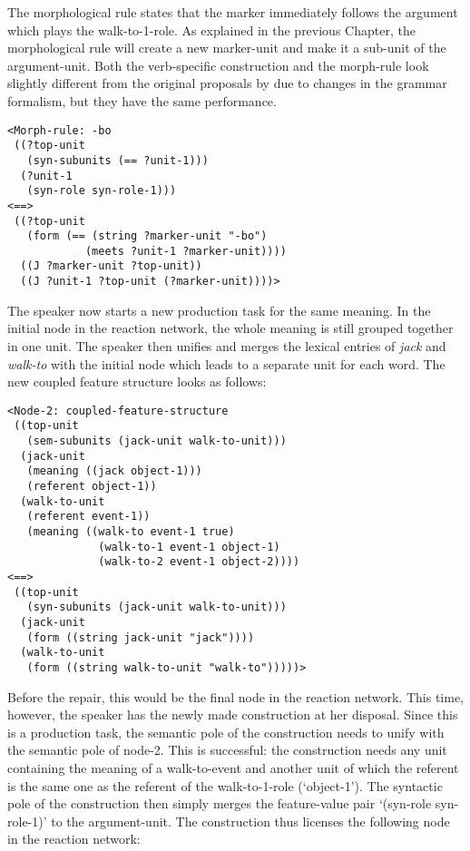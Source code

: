 The morphological rule states that the marker immediately follows the argument which plays the walk-to-1-role. As explained in the previous Chapter, the morphological rule will create a new marker-unit and make it a sub-unit of the argument-unit. Both the verb-specific construction and the morph-rule look slightly different from the original proposals by \citet{steels02simulating} due to changes in the grammar formalism, but they have the same performance.


\ea
\begin{lstlisting}
<Morph-rule: -bo
 ((?top-unit
   (syn-subunits (== ?unit-1)))
  (?unit-1
   (syn-role syn-role-1)))
<==>
 ((?top-unit
   (form (== (string ?marker-unit "-bo")
            (meets ?unit-1 ?marker-unit))))
  ((J ?marker-unit ?top-unit))
  ((J ?unit-1 ?top-unit (?marker-unit))))>
\end{lstlisting}
\z


The speaker now starts a new production task for the same meaning. In the initial node in the reaction network, the whole meaning is still grouped together in one unit. The speaker then unifies and merges the lexical entries of {\em jack} and {\em walk-to} with the initial node which leads to a separate unit for each word. The new coupled feature structure looks as follows:


\ea
\begin{lstlisting}
<Node-2: coupled-feature-structure
 ((top-unit
   (sem-subunits (jack-unit walk-to-unit)))
  (jack-unit
   (meaning ((jack object-1)))
   (referent object-1))
  (walk-to-unit
   (referent event-1))
   (meaning ((walk-to event-1 true)
              (walk-to-1 event-1 object-1)
              (walk-to-2 event-1 object-2))))
<==>
 ((top-unit
   (syn-subunits (jack-unit walk-to-unit)))
  (jack-unit
   (form ((string jack-unit "jack"))))
  (walk-to-unit
   (form ((string walk-to-unit "walk-to")))))>
\end{lstlisting}
\z


Before the repair, this would be the final node in the reaction network. This time, however, the speaker has the newly made construction at her disposal. Since this is a production task, the semantic pole of the construction needs to unify with the semantic pole of node-2. This is successful: the construction needs any unit containing the meaning of a walk-to-event and another unit of which the referent is the same one as the referent of the walk-to-1-role (`object-1'). The syntactic pole of the construction then simply merges the feature-value pair `(syn-role syn-role-1)' to the argument-unit. The construction thus licenses the following node in the reaction network:


